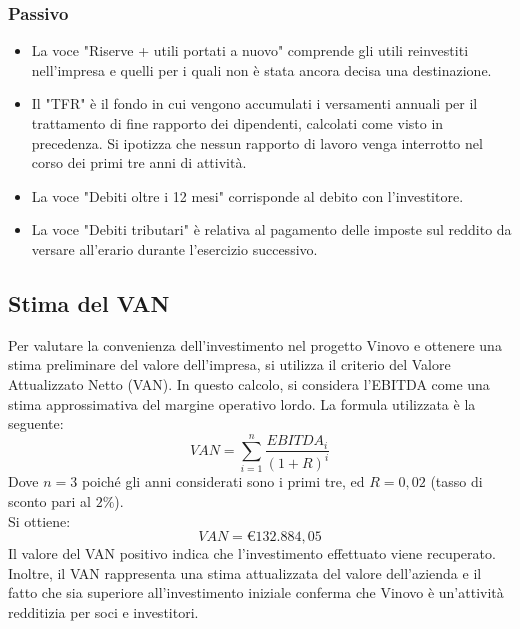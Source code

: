 \documentclass[12pt, a4paper]{article}
\newcommand{\meskip}{\medskip \\}
\begin{document}
\subsubsection*{Passivo}
\begin{itemize}
    \item La voce "Riserve + utili portati a nuovo" comprende gli utili reinvestiti nell'impresa e quelli per i quali non è stata ancora decisa una destinazione.
    \item Il "TFR" è il fondo in cui vengono accumulati i versamenti annuali per il trattamento di fine rapporto dei dipendenti, calcolati come visto in precedenza. Si ipotizza che nessun rapporto di lavoro venga interrotto nel corso dei primi tre anni di attività.
    \item La voce "Debiti oltre i 12 mesi" corrisponde al debito con l'investitore.
    \item La voce "Debiti tributari" è relativa al pagamento delle imposte sul reddito da versare all'erario durante l'esercizio successivo.
\end{itemize}



\subsection{Stima del VAN}
Per valutare la convenienza dell'investimento nel progetto Vinovo e ottenere una stima preliminare del valore dell'impresa, si utilizza il criterio del Valore Attualizzato Netto (VAN). In questo calcolo, si considera l'EBITDA come una stima approssimativa del margine operativo lordo. La formula utilizzata è la seguente:
$$ VAN = \sum_{i = 1}^{n}{\frac{EBITDA_i}{(1+R)^i}}$$
Dove $n=3$ poiché gli anni considerati sono i primi tre, ed $R = 0,02$ (tasso di sconto pari al $2\%$).\meskip
Si ottiene:
$$ VAN = € 132.884,05 $$
Il valore del VAN positivo indica che l'investimento effettuato viene recuperato. Inoltre, il VAN rappresenta una stima attualizzata del valore dell'azienda e il fatto che sia superiore all'investimento iniziale conferma che Vinovo è un'attività redditizia per soci e investitori.
\end{document}

